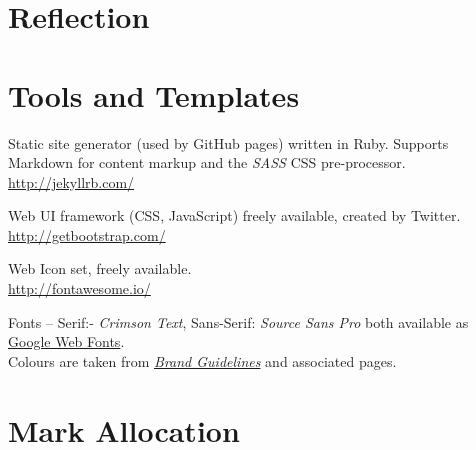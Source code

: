 \documentclass[a4paper, notoc]{tufte-handout}
\let\origdescription\description
\renewenvironment{description}{
  \setlength{\leftmargini}{1.5em}
  \origdescription
  \setlength{\itemindent}{-1.5em}
  \setlength{\labelsep}{\textwidth}
}
{\endlist}
\begin{document}
\section{Reflection}



\section{Tools and Templates}


\begin{description}

\item[Jekyll]
Static site generator (used by GitHub pages) written in Ruby. Supports Markdown for 
content markup and the \textit{SASS} CSS pre-processor.
\\
\href{http://jekyllrb.com/}{http://jekyllrb.com/}

\item[BootStrap]
Web UI framework (CSS, JavaScript) freely available, created by Twitter.
\\
\href{http://getbootstrap.com/}{http://getbootstrap.com/}

\item[FontAwesome]
Web Icon set, freely available.
\\
\href{http://fontawesome.io/}{http://fontawesome.io/}


\item[University of Edinburgh Style Guide]
Fonts -- Serif:- \textit{Crimson Text}, Sans-Serif: \textit{Source Sans Pro} both 
available as \href{https://fonts.google.com/}{Google Web Fonts}.
\\
Colours are taken from 
\href{http://www.ed.ac.uk/communications-marketing/resources}{\textit{Brand Guidelines}} 
and associated pages.
\\



\end{description}




\section*{Mark Allocation}







%
%
\end{document}
